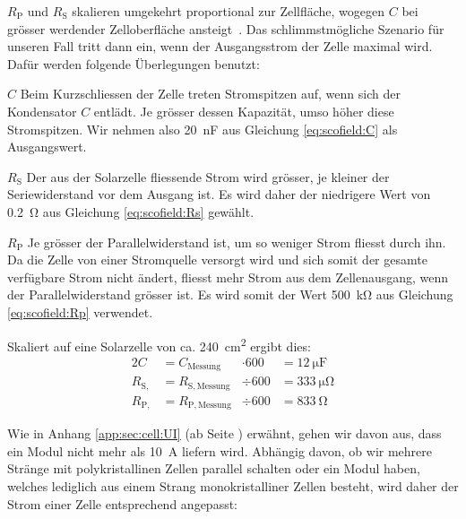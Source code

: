 $R_{\mathrm{P}}$   und  $R_{\mathrm{S}}$   skalieren  umgekehrt   proportional
zur  Zellfl\"ache,  wogegen  $C$   bei  gr\"osser  werdender  Zelloberfl\"ache
ansteigt~\cite{ref:solar:scofield}. Das  schlimmstm\"ogliche   Szenario  f\"ur
unseren  Fall  tritt  dann  ein,  wenn der  Ausgangsstrom  der  Zelle  maximal
wird. Daf\"ur werden folgende \"Uberlegungen benutzt:

\begin{symbols}
    \firmlist
    \item[$C$]
        Beim Kurzschliessen der  Zelle treten Stromspitzen auf,  wenn sich der
        Kondensator  $C$  entl\"adt. Je  gr\"osser  dessen  Kapazit\"at,  umso
        h\"oher diese Stromspitzen.  Wir  nehmen also \SI{20}{\nano\farad} aus
        Gleichung \ref{eq:scofield:C} als Ausgangswert.
    \item[$R_{\mathrm{S}}$]
        Der aus der Solarzelle fliessende Strom wird gr\"osser, je kleiner der
        Seriewiderstand vor dem Ausgang ist. Es wird daher der niedrigere Wert
        von \SI{0.2}{\ohm} aus Gleichung \ref{eq:scofield:Rs} gew\"ahlt.
    \item[$R_{\mathrm{P}}$]
        Je gr\"osser der  Parallelwiderstand ist, um so  weniger Strom fliesst
        durch ihn. Da die  Zelle von einer Stromquelle versorgt  wird und sich
        somit  der gesamte  verf\"ugbare  Strom nicht  \"andert, fliesst  mehr
        Strom  aus dem  Zellenausgang, wenn  der Parallelwiderstand  gr\"osser
        ist. Es  wird   somit  der  Wert  \SI{500}{\kilo\ohm}   aus  Gleichung
        \ref{eq:scofield:Rp} verwendet.
\end{symbols}

Skaliert auf eine Solarzelle von ca. \SI{240}{\centi\meter\squared} ergibt dies:
\begin{alignat}{2}
    C               &= C_{\mathrm{Messung}}    &\cdot 600 &= \SI{12}{\micro\farad} \\
    R_{\mathrm{S,}} &= R_{\mathrm{S, Messung}} &\div  600 &= \SI{333}{\micro\ohm}    \\
    R_{\mathrm{P,}} &= R_{\mathrm{P, Messung}} &\div  600 &= \SI{833}{\ohm}
\end{alignat}

Wie  in  Anhang  \ref{app:sec:cell:UI}  (ab  Seite  \pageref{app:sec:cell:UI})
erw\"ahnt, gehen wir davon aus, dass ein Modul nicht mehr als \SI{10}{\ampere}
liefern wird. Abh\"angig davon, ob  wir mehrere Str\"ange mit polykristallinen
Zellen parallel  schalten oder  ein Modul haben,  welches lediglich  aus einem
Strang  monokristalliner Zellen  besteht,  wird daher  der  Strom einer  Zelle
entsprechend angepasst:

